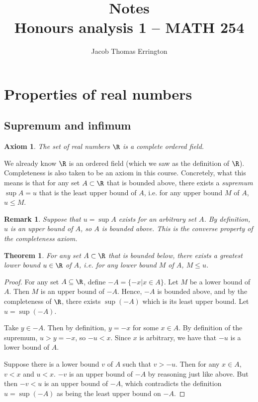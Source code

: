 \documentclass[letterpaper,11pt]{article}
\author{Jacob Thomas Errington}
\title{Notes\\Honours analysis 1 -- MATH 254}
\date{}
\newtheorem{thm}{Theorem}
\newtheorem{axm}{Axiom}
\newtheorem{rem}{Remark}
\begin{document}
\maketitle

\section{Properties of real numbers}

\subsection{Supremum and infimum}

\begin{axm}
  The set of real numbers $\R$ is a complete ordered field.
\end{axm}

We already know $\R$ is an ordered field (which we saw as the definition of
$\R$). Completeness is also taken to be an axiom in this course. Concretely,
what this means is that for any set $A \subset \R$ that is bounded above, there
exists a \emph{supremum} $\sup A = u$ that is the least upper bound of $A$,
i.e. for any upper bound $M$ of $A$, $u \leq M$.

\begin{rem}
  Suppose that $u = \sup A$ exists for an arbitrary set $A$. By definition, $u$
  is an upper bound of $A$, so $A$ is bounded above. This is the converse
  property of the completeness axiom.
\end{rem}

\begin{thm}
  For any set $A \subset \R$ that is bounded below, there exists a greatest
  lower bound $u \in \R$ of $A$, i.e. for any lower bound $M$ of $A$, $M \leq
  u$.
  \label{thm:exists-infimum}
\end{thm}

\begin{proof}
  For any set $A \subseteq \R$, define $-A = \{ -x | x \in A \}$. Let $M$ be a
  lower bound of $A$. Then $M$ is an upper bound of $-A$. Hence, $-A$ is
  bounded above, and by the completeness of $\R$, there exists $\sup(-A)$ which
  is its least upper bound. Let $u = \sup(-A)$.

  Take $y \in -A$. Then by definition, $y = -x$ for some $x \in A$. By
  definition of the supremum, $u > y = -x$, so $-u < x$. Since $x$ is
  arbitrary, we have that $-u$ is a lower bound of $A$.

  Suppose there is a lower bound $v$ of $A$ such that $v > -u$. Then for any
  $x \in A$, $v < x$ and $u < x$. $-v$ is an upper bound of $-A$ by reasoning
  just like above. But then $-v < u$ is an upper bound of $-A$, which
  contradicts the definition $u = \sup(-A)$ as being the least upper bound on
  $-A$.
\end{proof}
\end{document}
